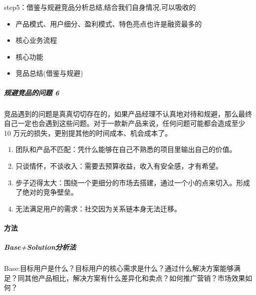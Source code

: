 \documentclass[letterpaper,11pt,english]{sphinxmanual}
\begin{document}
step5：借鉴与规避竞品分析总结,结合我们自身情况,可以吸收的
\begin{itemize}
\item {} 
产品模式、用户细分、盈利模式、特色亮点也许是融资最多的

\item {} 
核心业务流程

\item {} 
核心功能

\item {} 
竞品总结(借鉴与规避)

\end{itemize}


\subparagraph{规避竞品的问题 6\sphinxfootnotemark[458]}
\label{\detokenize{chapter_knowledge/goods_analysis:id23}}%
\begin{footnotetext}[458]\sphinxAtStartFootnote
{}
%
\end{footnotetext}\ignorespaces 
竞品遇到的问题是真真切切存在的，如果产品经理不认真地对待和规避，那么最终自己一定也会遇到这些问题。对于一款新产品来说，任何问题可能都会造成至少
10 万元的损失，更别提其他的时间成本、机会成本了。
\begin{enumerate}
%
\item {} 
团队和产品不匹配：凭什么能够在自己不熟悉的项目里输出自己的价值。

\item {} 
只谈情怀，不谈收入：需要去预算收益，收入有安全感，才有希望。

\item {} 
步子迈得太大：围绕一个更细分的市场去搭建，通过一个小的点来切入。形成了绝对的竞争壁垒。

\item {} 
无法满足用户的需求：社交因为关系链本身无法迁移。

\end{enumerate}


\paragraph{方法}
\label{\detokenize{chapter_knowledge/goods_analysis:id24}}

\subparagraph{Base+Solution分析法}
\label{\detokenize{chapter_knowledge/goods_analysis:base-solution}}
Base:目标用户是什么？目标用户的核心需求是什么？通过什么解决方案能够满足？同其他产品相比，解决方案有什么差异化和卖点？如何推广营销？市场效果如何？
\end{document}

